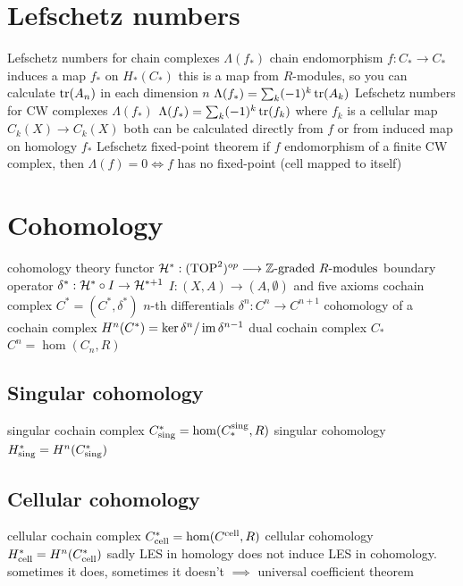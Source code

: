 \section{Lefschetz numbers}

\begin{outline}
    \1 Lefschetz numbers for chain complexes $\Lambda(f_*)$
        \2 chain endomorphism $f:C_* \rightarrow C_*$ induces a map $f_*$ on $H_*(C_*)$
        \2 this is a map from $R$-modules, so you can calculate $\operatorname{tr}(A_n)$ in each dimension $n$
        \2 $\Lambda(f_*)=\sum_k (-1)^k \operatorname{tr}(A_k)$
    \1 Lefschetz numbers for CW complexes $\Lambda(f_*)$
        \2 $\Lambda(f_*)=\sum_k (-1)^k \operatorname{tr}(f_k)$ where $f_k$ is a cellular map $C_k(X)\rightarrow C_k(X)$ 
    \1 both can be calculated directly from $f$ or from induced map on homology $f_*$
    \1 Lefschetz fixed-point theorem
        \2 if $f$ endomorphism of a finite CW complex, then $\Lambda(f)=0 \iff f$ has no fixed-point (cell mapped to itself) 
\end{outline}

\section{Cohomology}


\begin{outline}
    \1 cohomology theory
        \2 functor $\mathcal{H}^*:(\operatorname{TOP}^2)^{op} \longrightarrow \text{$\mathbb{Z}$-graded $R$-modules}$
        \2 boundary operator $\delta^* : \mathcal{H}^*\circ I \rightarrow \mathcal{H}^{*+1}$
            \3 $I:(X,A)\rightarrow (A,\emptyset)$
        \2 and five axioms
    \1 cochain complex $C^*=(C^*, \delta^*)$
        \2 $n$-th differentials $\delta^n:C^n\rightarrow C^{n+1}$
    \1 cohomology of a cochain complex $H^n(C^*)=\ker \delta^n/\operatorname{im} \delta^{n-1}$
    \1 dual cochain complex $C_*$
        \2 $C^n=\hom(C_n,R)$
        
\subsection{Singular cohomology}

    \1 singular cochain complex $C_{\operatorname{sing}}^* = \hom(C^{\operatorname{sing}}_*,R)$
    \1 singular cohomology $H_{\operatorname{sing}}^* = H^n(C_{\operatorname{sing}}^*)$
    
\subsection{Cellular cohomology}


    \1 cellular cochain complex $C_{\operatorname{cell}}^* = \hom(C^{\operatorname{cell}},R)$
    \1 cellular cohomology $H_{\operatorname{cell}}^* = H^n(C_{\operatorname{cell}}^*)$
    \1 sadly LES in homology does not induce LES in cohomology. sometimes it does, sometimes it doesn't $\implies $ universal coefficient theorem
\end{outline}

